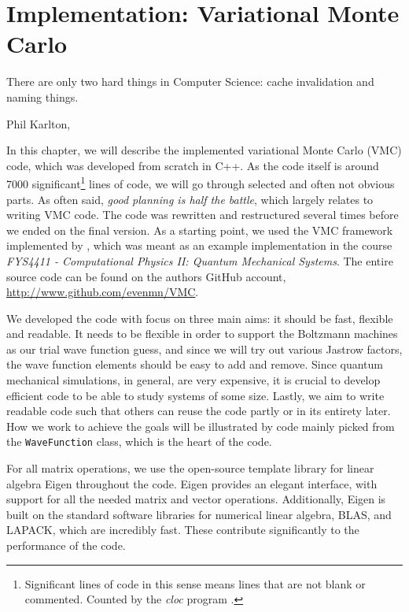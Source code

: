 \chapter{Implementation: Variational Monte Carlo} \label{chp:WFE}
\epigraph{There are only two hard things in Computer Science: cache invalidation and naming things.}{Phil Karlton, \supercite{fowler_bliki:_nodate}}
\iffalse
\begin{figure}[H]
	\centering
	\texttt{[image: Images/example.png]}
	\caption{Caption}
\end{figure}
\fi

In this chapter, we will describe the implemented variational Monte Carlo (VMC) code, which was developed from scratch in C++. As the code itself is around 7000 significant\footnote{Significant lines of code in this sense means lines that are not blank or commented. Counted by the \textit{cloc} program \supercite{aldanial_cloc_2019}.} lines of code, we will go through selected and often not obvious parts. As often said, \textit{good planning is half the battle}, which largely relates to writing VMC code. The code was rewritten and restructured several times before we ended on the final version. As a starting point, we used the VMC framework implemented by \citet{ledum_simple_2016}, which was meant as an example implementation in the course \textit{FYS4411 - Computational Physics II: Quantum Mechanical Systems}. The entire source code can be found on the authors GitHub account, \url{http://www.github.com/evenmn/VMC}.

We developed the code with focus on three main aims: it should be fast, flexible and readable. It needs to be flexible in order to support the Boltzmann machines as our trial wave function guess, and since we will try out various Jastrow factors, the wave function elements should be easy to add and remove. Since quantum mechanical simulations, in general, are very expensive, it is crucial to develop efficient code to be able to study systems of some size. Lastly, we aim to write readable code such that others can reuse the code partly or in its entirety later.  How we work to achieve the goals will be illustrated by code mainly picked from the \lstinline{WaveFunction} class, which is the heart of the code.

For all matrix operations, we use the open-source template library for linear algebra Eigen throughout the code. Eigen provides an elegant interface, with support for all the needed matrix and vector operations. Additionally, Eigen is built on the standard software libraries for numerical linear algebra, BLAS, and LAPACK, which are incredibly fast. These contribute significantly to the performance of the code. 

